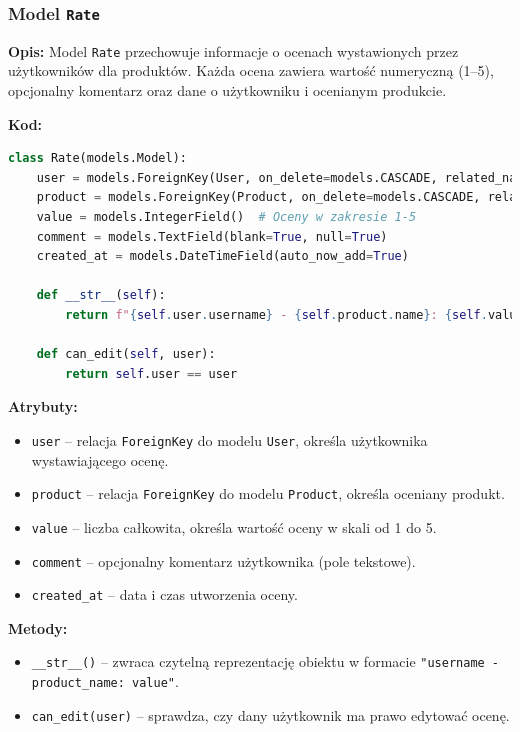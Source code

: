 \documentclass[12pt,a4paper,oneside]{article}
\theoremstyle{definition}
\numberwithin{equation}{section}
\begin{document}
\subsubsection{Model \texttt{Rate}}

\textbf{Opis:}  
Model \texttt{Rate} przechowuje informacje o ocenach wystawionych przez użytkowników dla produktów. Każda ocena zawiera wartość numeryczną (1–5), opcjonalny komentarz oraz dane o użytkowniku i ocenianym produkcie.

\textbf{Kod:}
\begin{lstlisting}[language=Python]
class Rate(models.Model):
    user = models.ForeignKey(User, on_delete=models.CASCADE, related_name='ratings')
    product = models.ForeignKey(Product, on_delete=models.CASCADE, related_name='ratings')
    value = models.IntegerField()  # Oceny w zakresie 1-5
    comment = models.TextField(blank=True, null=True)
    created_at = models.DateTimeField(auto_now_add=True)

    def __str__(self):
        return f"{self.user.username} - {self.product.name}: {self.value}"

    def can_edit(self, user):
        return self.user == user
\end{lstlisting}

\textbf{Atrybuty:}
\begin{itemize}
    \item \texttt{user} – relacja \texttt{ForeignKey} do modelu \texttt{User}, określa użytkownika wystawiającego ocenę.
    \item \texttt{product} – relacja \texttt{ForeignKey} do modelu \texttt{Product}, określa oceniany produkt.
    \item \texttt{value} – liczba całkowita, określa wartość oceny w skali od 1 do 5.
    \item \texttt{comment} – opcjonalny komentarz użytkownika (pole tekstowe).
    \item \texttt{created\_at} – data i czas utworzenia oceny.
\end{itemize}

\textbf{Metody:}
\begin{itemize}
    \item \texttt{\_\_str\_\_()} – zwraca czytelną reprezentację obiektu w formacie \texttt{"username - product\_name: value"}.
    \item \texttt{can\_edit(user)} – sprawdza, czy dany użytkownik ma prawo edytować ocenę.
\end{itemize}
\end{document}
